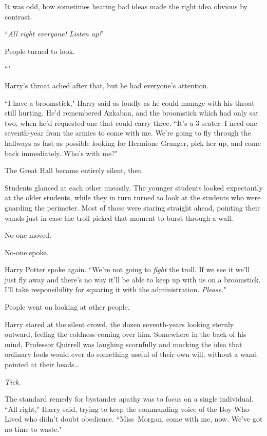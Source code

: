 It was odd, how sometimes hearing bad ideas made the right idea obvious by contrast.

``\emph{All right everyone! Listen up!}"

People turned to look.

``"

Harry's throat ached after that, but he had everyone's attention.

``I have a broomstick," Harry said as loudly as he could manage with his throat still hurting. He'd remembered Azkaban, and the broomstick which had only sat two, when he'd requested one that could carry three. ``It's a 3-seater. I need one seventh-year from the armies to come with me. We're going to fly through the hallways as fast as possible looking for Hermione Granger, pick her up, and come back immediately. Who's with me?"

The Great Hall became entirely silent, then.

\later

Students glanced at each other uneasily. The younger students looked expectantly at the older students, while they in turn turned to look at the students who were guarding the perimeter. Most of those were staring straight ahead, pointing their wands just in case the troll picked that moment to burst through a wall.

No-one moved.

No-one spoke.

Harry Potter spoke again. ``We're not going to \emph{fight} the troll. If we see it we'll just fly away and there's no way it'll be able to keep up with us on a broomstick. I'll take responsibility for squaring it with the administration. \emph{Please.}"

People went on looking at other people.

\later

Harry stared at the silent crowd, the dozen seventh-years looking sternly outward, feeling the coldness coming over him. Somewhere in the back of his mind, Professor Quirrell was laughing scornfully and mocking the idea that ordinary fools would ever do something useful of their own will, without a wand pointed at their heads{\ldots}

\emph{Tick.}

The standard remedy for bystander apathy was to focus on a single individual. ``All right," Harry said, trying to keep the commanding voice of the Boy-Who-Lived who didn't doubt obedience. ``Miss~Morgan, come with me, now. We've got no time to waste."

